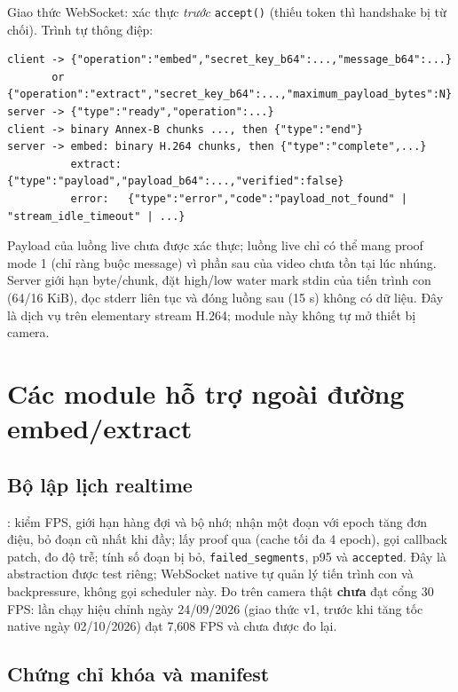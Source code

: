 \documentclass[11pt,a4paper]{article}
\begin{document}
Giao thức WebSocket: xác thực \emph{trước} \texttt{accept()} (thiếu token thì
handshake bị từ chối). Trình tự thông điệp:
\begin{lstlisting}[numbers=none]
client -> {"operation":"embed","secret_key_b64":...,"message_b64":...}
       or {"operation":"extract","secret_key_b64":...,"maximum_payload_bytes":N}
server -> {"type":"ready","operation":...}
client -> binary Annex-B chunks ..., then {"type":"end"}
server -> embed: binary H.264 chunks, then {"type":"complete",...}
          extract: {"type":"payload","payload_b64":...,"verified":false}
          error:   {"type":"error","code":"payload_not_found" | "stream_idle_timeout" | ...}
\end{lstlisting}
Payload của luồng live chưa được xác thực; luồng live chỉ có thể mang proof mode 1
(chỉ ràng buộc message) vì phần sau của video chưa tồn tại lúc nhúng.
Server giới hạn byte/chunk, đặt high/low water mark stdin của tiến trình con
(64/16 KiB), đọc stderr liên tục và đóng luồng sau
 (15 s) không có dữ liệu. Đây là dịch vụ
trên elementary stream H.264; module này không tự mở thiết bị camera.

\section{Các module hỗ trợ ngoài đường embed/extract}

\subsection{Bộ lập lịch realtime}

:  kiểm FPS,
giới hạn hàng đợi và bộ nhớ;  nhận một đoạn với
epoch tăng đơn điệu, bỏ đoạn cũ nhất khi đầy;  lấy proof qua
 (cache tối đa 4 epoch), gọi callback patch, đo độ trễ;
 tính số đoạn bị bỏ, \texttt{failed\_segments}, p95 và
\texttt{accepted}. Đây là abstraction được test riêng; WebSocket native tự quản lý
tiến trình con và backpressure, không gọi scheduler này. Đo trên camera thật
\textbf{chưa} đạt cổng 30 FPS: lần chạy hiệu chỉnh ngày 24/09/2026 (giao thức v1, trước
khi tăng tốc native ngày 02/10/2026) đạt 7,608 FPS và chưa được đo lại.

\subsection{Chứng chỉ khóa và manifest}
\end{document}
